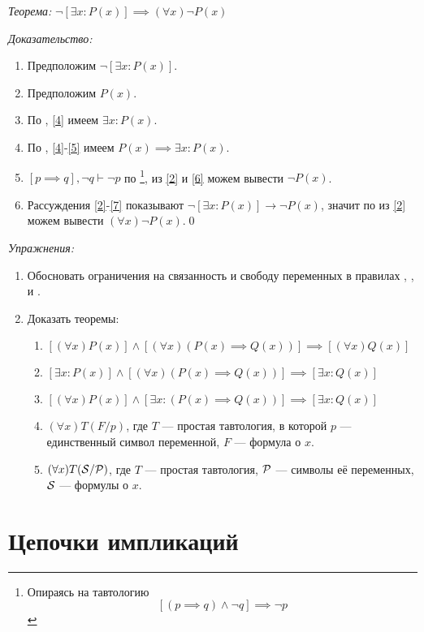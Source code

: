 \vspace{1em}
{\it Теорема:} $\lnot [\exists x:P(x)]\implies  (\forall x)\lnot P(x)$

{\it Доказательство:}
\begin{enumerate}[label=(\arabic*)]
	\item{}\label{2}Предположим $\lnot [\exists x:P(x)]$.
	\item{}\label{4}Предположим $P(x)$.
	\item{}\label{5}По \Eii{}, \ref{4} имеем $\exists x:P(x)$.
	\item{}\label{6}По \implic{}, \ref{4}-\ref{5} имеем
	$P(x)\implies \exists x:P(x)$.
	\item{}\label{7}${[p\implies q],\lnot q\vdash \lnot p}$ по \taut{}\footnote{
		Опираясь на тавтологию
		\[
			[(p\implies q)\land\lnot q]\implies\lnot p
		\]
	}, из
	\ref{2} и \ref{6} можем вывести $\lnot P(x)$.
	\item{}\label{8}Рассуждения \ref{2}-\ref{7} показывают
	$\lnot[\exists x:P(x)]\to\lnot P(x)$, значит по \Aii{} из \ref{2} можем
	вывести $(\forall x)\lnot P(x)$.\qed
\end{enumerate}

\pagebreak
{\it Упражнения:}
\begin{enumerate}
	\item{}Обосновать ограничения на связанность и свободу переменных в правилах
	\Aii{}, \Aee{}, \Eii{} и \Eee{}.
	\item{}\label{ex:obv_thm}Доказать теоремы:
	\begin{enumerate}
		\item{}$[(\forall x)P(x)]\land[(\forall x)(P(x)\implies Q(x))]
			\implies [(\forall x)Q(x)]$\label{thm:obv_forall}
		\item{}$[\exists x:P(x)]\land[(\forall x)(P(x)\implies Q(x))]
			\implies [\exists x:Q(x)]$
		\item{}$[(\forall x)P(x)]\land [\exists x:(P(x)\implies Q(x))]
			\implies [\exists x:Q(x)]$
		\item{}$(\forall x)T(F/p)$, где $T$ --- простая тавтология,
		в которой $p$ --- единственный символ переменной, $F$ --- формула о $x$.
		\item{}$(\forall x)T(\mathcal S/\mathcal P)$, где $T$ --- простая тавтология,
		$\mathcal P$ --- символы её переменных, $\mathcal S$ --- формулы о $x$.\label{thm:obv_taut}
	\end{enumerate}
\end{enumerate}

\section{Цепочки импликаций}

